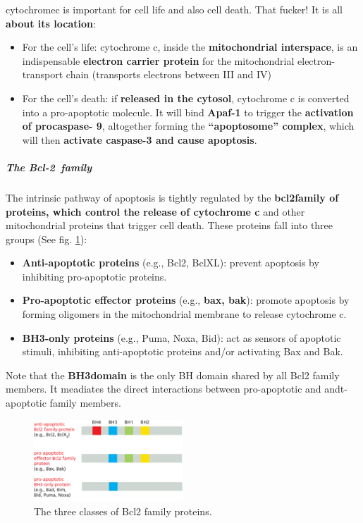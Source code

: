 \documentclass[../main.tex]{subfiles}
\begin{document}
\begin{RemarkWithTitel}{\gls{cytochromec} is important for cell life and also cell death. That fucker!}
	It is all \textbf{about its location}: 
	\begin{itemize}
		\item For the cell’s life: cytochrome c, inside the \textbf{mitochondrial interspace}, is an indispensable \textbf{electron carrier protein} for the mitochondrial electron-transport chain (transports electrons between III and IV)
		
		\item For the cell’s death: if \textbf{released in the cytosol}, cytochrome c is converted into a pro-apoptotic molecule. It will bind \textbf{Apaf-1} to trigger the \textbf{activation of procaspase- 9}, altogether forming the \textbf{“apoptosome” complex}, which will then \textbf{activate caspase-3  and cause apoptosis}.
	\end{itemize}
\end{RemarkWithTitel}

\subparagraph{The Bcl-2~family}
The intrinsic pathway of apoptosis is tightly regulated by the \textbf{\gls{bcl2family} of proteins, which control the release of cytochrome c} and other mitochondrial proteins that trigger cell death. These proteins fall into three groups (See fig. \ref{Bcl-2-family}):
\begin{itemize}
	\item \textbf{Anti-apoptotic proteins} (e.g., Bcl2, BclXL): prevent apoptosis by inhibiting pro-apoptotic proteins.
	
	\item \textbf{Pro-apoptotic effector proteins} (e.g., \textbf{\gls{bax}, \gls{bak}}): promote apoptosis by forming oligomers in the mitochondrial membrane to release cytochrome c.
	
	\item \textbf{BH3-only proteins} (e.g., Puma, Noxa, Bid): act as sensors of apoptotic stimuli, inhibiting anti-apoptotic proteins and/or activating Bax and Bak.
\end{itemize}
Note that the \textbf{\gls{BH3domain}} is the only BH domain shared by all Bcl2 family members. It meadiates the direct interactions between pro-apoptotic and andt-apoptotic family members. 

\begin{figure}[H]
	\centering
	\includegraphics[width = 0.5\textwidth]{10}
	\caption{The three classes of Bcl2 family proteins.}
	\label{Bcl-2-family}
\end{figure}
\end{document}
